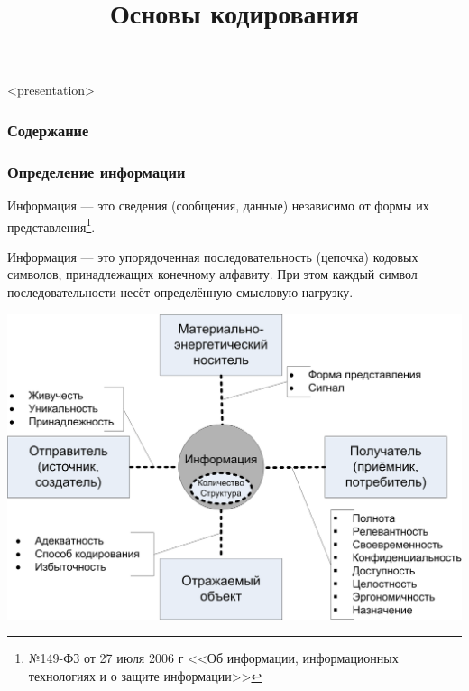 


\title{Основы кодирования}





\begin{frame}<presentation>
    \frametitle{Содержание}
    \tableofcontents
\end{frame}


\begin{frame}
    \frametitle{Определение информации}
    
    \begin{definition}[Юридическое]
        \alert{Информация} --- это сведения (сообщения, данные) независимо от формы их представления\footnote{№149-ФЗ от 27 июля 2006 г <<Об информации, информационных технологиях и о защите информации>>}.
    \end{definition}
    
    \begin{definition}
        \alert{Информация} --- это упорядоченная последовательность (цепочка) \alert{кодовых символов}, принадлежащих конечному алфавиту. При этом каждый символ последовательности несёт определённую смысловую нагрузку.
    \end{definition}
\end{frame}

\begin{frame}
    \begin{center}
        \includegraphics[width=.95\textwidth]{fig/iproperties}
    \end{center}
\end{frame}


